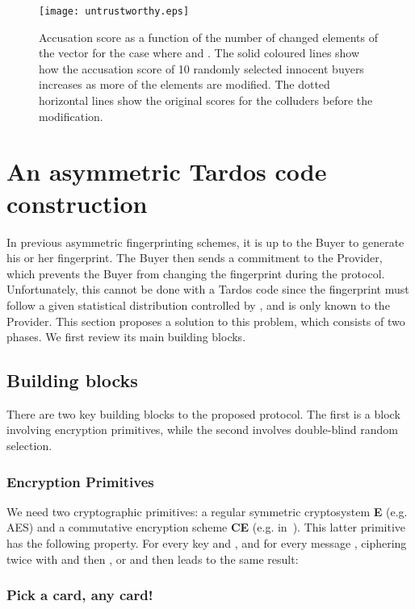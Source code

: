 \documentclass{article}
\begin{document}
\begin{figure}
  \centering
  \texttt{[image: untrustworthy.eps]}
  \caption{
Accusation score as a function of the number of changed elements of
the vector  for the case where  and .
The solid coloured lines show how the accusation score of 10 randomly selected innocent buyers
increases as
more of the elements are modified.
The dotted horizontal lines show the original scores for the colluders
before the modification.}

  \label{fig:untrustworthy}
\end{figure}


\section{An asymmetric Tardos code construction}
\label{sec:Construction}

In previous asymmetric fingerprinting schemes, it is up to the Buyer
to generate his or her fingerprint.  The Buyer then sends a commitment
to the Provider, which prevents the Buyer from changing the fingerprint during the
protocol. Unfortunately, this cannot be done with a Tardos code since the
fingerprint must follow a given statistical distribution controlled by
, and  is only known to the Provider. This section
proposes a solution to this problem, which consists of two phases.  We first review its main building blocks.

\subsection{Building blocks}

There are two key building blocks to the proposed protocol.  The first
is a block involving encryption primitives, while the second involves
double-blind random selection.

\subsubsection{Encryption Primitives}
We need two cryptographic primitives: a regular symmetric cryptosystem
\textbf{E} (e.g. AES) and a commutative encryption scheme \textbf{CE}
(e.g. in~\cite{bao_icisc_00,bao_icics_01}). This latter
primitive has the following property. For every key  and , and
for every message , ciphering twice with  and then , or
 and then  leads to the same result:


\subsubsection{Pick a card, any card!}
\label{subsec:card}
\end{document}
